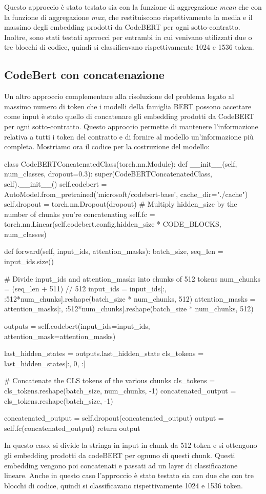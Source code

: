 \documentclass[../../Thesis.tex]{subfiles}
\begin{document}
Questo approccio \`e stato testato sia con la funzione di aggregazione \emph{mean} che con la funzione di aggregazione \emph{max}, che restituiscono rispettivamente la media e il massimo degli embedding prodotti da CodeBERT per ogni sotto-contratto. Inoltre, sono stati testati aprrocci per entrambi in cui venivano utilizzati due o tre blocchi di codice, quindi si classificavano rispettivamente 1024 e 1536 token.
\subsection{CodeBert con concatenazione}
Un altro approccio complementare alla risoluzione del problema legato al massimo numero di token che i modelli della famiglia BERT possono accettare come input \`e stato quello di concatenare gli embedding prodotti da CodeBERT per ogni sotto-contratto. Questo approccio permette di mantenere l'informazione relativa a tutti i token del contratto e di fornire al modello un'informazione pi\`u completa. Mostriamo ora il codice per la costruzione del modello:
\begin{python}
    class CodeBERTConcatenatedClass(torch.nn.Module):
    def __init__(self, num_classes, dropout=0.3):
        super(CodeBERTConcatenatedClass, self).__init__()
        self.codebert = AutoModel.from_pretrained('microsoft/codebert-base', cache_dir="./cache")
        self.dropout = torch.nn.Dropout(dropout)
        # Multiply hidden_size by the number of chunks you're concatenating
        self.fc = torch.nn.Linear(self.codebert.config.hidden_size * CODE_BLOCKS, num_classes)

    def forward(self, input_ids, attention_masks):
        batch_size, seq_len = input_ids.size()

        # Divide input_ids and attention_masks into chunks of 512 tokens
        num_chunks = (seq_len + 511) // 512
        input_ids = input_ids[:, :512*num_chunks].reshape(batch_size * num_chunks, 512)
        attention_masks = attention_masks[:, :512*num_chunks].reshape(batch_size * num_chunks, 512)

        outputs = self.codebert(input_ids=input_ids, attention_mask=attention_masks)

        last_hidden_states = outputs.last_hidden_state
        cls_tokens = last_hidden_states[:, 0, :]

        # Concatenate the CLS tokens of the various chunks
        cls_tokens = cls_tokens.reshape(batch_size, num_chunks, -1)
        concatenated_output = cls_tokens.reshape(batch_size, -1)

        concatenated_output = self.dropout(concatenated_output)
        output = self.fc(concatenated_output)
        return output
\end{python}
In questo caso, si divide la stringa in input in chunk da 512 token e si ottengono gli embedding prodotti da codeBERT per ognuno di questi chunk. Questi embedding vengono poi concatenati e passati ad un layer di classificazione lineare. Anche in questo caso l'approccio \`e stato testato sia con due che con tre blocchi di codice, quindi si classificavano rispettivamente 1024 e 1536 token. 
\end{document}
